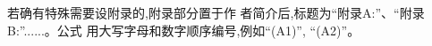 \documentclass[10.5pt,twocolumn]{aaas}
\begin{document}

\vskip 20pt
 
 
若确有特殊需要设附录的,附录部分置于作
者简介后,标题为“附录A:”、“附录B:”......。公式
用大写字母和数字顺序编号,例如“(A1)”, “(A2)”。





\newpage
\end{document}
